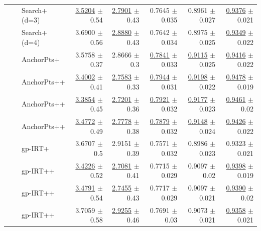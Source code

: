 \begin{longtable}{llp{}rrrrr}
 &  & Search+ (d=3) & \underline{3.5204} {\scriptsize $\pm$ 0.54} & \underline{2.7901} {\scriptsize $\pm$ 0.43} & 0.7645 {\scriptsize $\pm$ 0.035} & 0.8961 {\scriptsize $\pm$ 0.027} & \underline{0.9376} {\scriptsize $\pm$ 0.021} \\
 &  & Search+ (d=4) & 3.6900 {\scriptsize $\pm$ 0.56} & \underline{2.8880} {\scriptsize $\pm$ 0.43} & 0.7642 {\scriptsize $\pm$ 0.034} & 0.8975 {\scriptsize $\pm$ 0.025} & \underline{0.9349} {\scriptsize $\pm$ 0.022} \\
 &  & AnchorPts+ & 3.5758 {\scriptsize $\pm$ 0.37} & 2.8666 {\scriptsize $\pm$ 0.3} & \underline{0.7841} {\scriptsize $\pm$ 0.033} & \underline{0.9115} {\scriptsize $\pm$ 0.025} & \underline{0.9416} {\scriptsize $\pm$ 0.022} \\
 &  & AnchorPts++ & \underline{3.4002} {\scriptsize $\pm$ 0.41} & \underline{2.7583} {\scriptsize $\pm$ 0.33} & \underline{0.7944} {\scriptsize $\pm$ 0.031} & \underline{0.9198} {\scriptsize $\pm$ 0.022} & \underline{0.9478} {\scriptsize $\pm$ 0.019} \\
 &  & AnchorPts++ & \underline{3.3854} {\scriptsize $\pm$ 0.45} & \underline{2.7201} {\scriptsize $\pm$ 0.36} & \underline{0.7921} {\scriptsize $\pm$ 0.032} & \underline{0.9177} {\scriptsize $\pm$ 0.023} & \underline{0.9461} {\scriptsize $\pm$ 0.02} \\
 &  & AnchorPts++ & \underline{3.4772} {\scriptsize $\pm$ 0.49} & \underline{2.7778} {\scriptsize $\pm$ 0.38} & \underline{0.7879} {\scriptsize $\pm$ 0.032} & \underline{0.9148} {\scriptsize $\pm$ 0.024} & \underline{0.9426} {\scriptsize $\pm$ 0.022} \\
 &  & gp-IRT+ & 3.6707 {\scriptsize $\pm$ 0.5} & 2.9151 {\scriptsize $\pm$ 0.39} & 0.7571 {\scriptsize $\pm$ 0.032} & 0.8986 {\scriptsize $\pm$ 0.023} & 0.9323 {\scriptsize $\pm$ 0.021} \\
 &  & gp-IRT++ & \underline{3.4226} {\scriptsize $\pm$ 0.52} & \underline{2.7081} {\scriptsize $\pm$ 0.41} & 0.7715 {\scriptsize $\pm$ 0.029} & 0.9097 {\scriptsize $\pm$ 0.02} & \underline{0.9398} {\scriptsize $\pm$ 0.019} \\
 &  & gp-IRT++ & \underline{3.4791} {\scriptsize $\pm$ 0.54} & \underline{2.7455} {\scriptsize $\pm$ 0.43} & 0.7717 {\scriptsize $\pm$ 0.029} & 0.9097 {\scriptsize $\pm$ 0.021} & \underline{0.9390} {\scriptsize $\pm$ 0.02} \\
 &  & gp-IRT++ & 3.7059 {\scriptsize $\pm$ 0.58} & \underline{2.9255} {\scriptsize $\pm$ 0.46} & 0.7691 {\scriptsize $\pm$ 0.03} & 0.9073 {\scriptsize $\pm$ 0.021} & \underline{0.9358} {\scriptsize $\pm$ 0.021} \\

\end{longtable}
